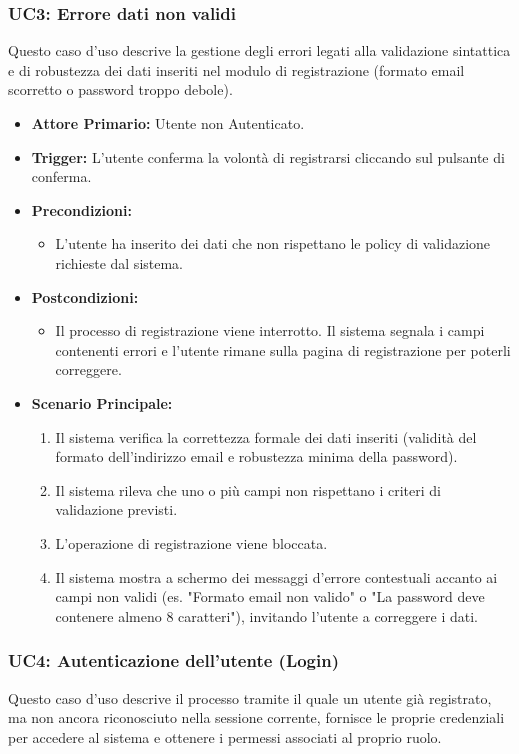 \documentclass[12pt, a4paper]{article}
\begin{document}
\subsubsection{UC3: Errore dati non validi}\label{uc:3}
Questo caso d'uso descrive la gestione degli errori legati alla validazione sintattica e di robustezza dei dati inseriti nel modulo di registrazione (formato email scorretto o password troppo debole).
\begin{itemize}
    \item \textbf{Attore Primario:} Utente non Autenticato.
    \item \textbf{Trigger:} L'utente conferma la volontà di registrarsi cliccando sul pulsante di conferma.
    \item \textbf{Precondizioni:}\begin{itemize}\item L'utente ha inserito dei dati che non rispettano le policy di validazione richieste dal sistema.\end{itemize}
    \item \textbf{Postcondizioni:}\begin{itemize}\item Il processo di registrazione viene interrotto. Il sistema segnala i campi contenenti errori e l'utente rimane sulla pagina di registrazione per poterli correggere.\end{itemize}
    \item \textbf{Scenario Principale:}
    \begin{enumerate}
        \item Il sistema verifica la correttezza formale dei dati inseriti (validità del formato dell'indirizzo email e robustezza minima della password).
        \item Il sistema rileva che uno o più campi non rispettano i criteri di validazione previsti.
        \item L'operazione di registrazione viene bloccata.
        \item Il sistema mostra a schermo dei messaggi d'errore contestuali accanto ai campi non validi (es. "Formato email non valido" o "La password deve contenere almeno 8 caratteri"), invitando l'utente a correggere i dati.
    \end{enumerate}
\end{itemize}
\newpage
\subsubsection{UC4: Autenticazione dell'utente (Login)}\label{uc:4}
Questo caso d'uso descrive il processo tramite il quale un utente già registrato, ma non ancora riconosciuto nella sessione corrente, fornisce le proprie credenziali per accedere al sistema e ottenere i permessi associati al proprio ruolo.
\end{document}
